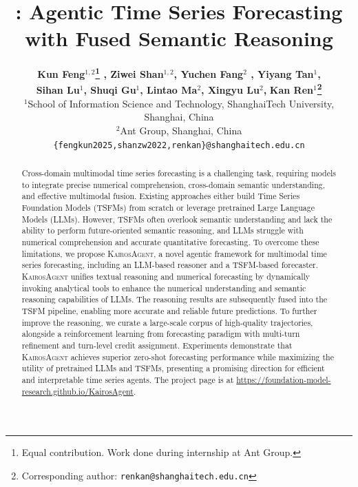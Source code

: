 \documentclass[11pt]{article}
\title{\method: Agentic Time Series Forecasting with Fused Semantic Reasoning}
\author{
\textbf{Kun Feng$^{1, 2}$\thanks{
Equal contribution.
Work done during internship at Ant Group.
} ,
Ziwei Shan$^{1, 2}$\footnotemark[1] ,
Yuchen Fang$^{2}$ ,
Yiyang Tan$^{1}$,}
\\
\textbf{Sihan Lu$^{1}$, Shuqi Gu$^{1}$, Lintao Ma$^{2}$, Xingyu Lu$^{2}$,}
\textbf{Kan Ren$^{1}$\thanks{Corresponding author: \texttt{renkan@shanghaitech.edu.cn}}} \\
$^{1}$School of Information Science and Technology, ShanghaiTech University, Shanghai, China \\
$^{2}$Ant Group, Shanghai, China \\
\texttt{\{fengkun2025,shanzw2022,renkan\}@shanghaitech.edu.cn}
}
\newcommand{\method}{\textsc{KairosAgent}\xspace}
\begin{document}
\maketitle
\begin{abstract}
Cross-domain multimodal time series forecasting is a challenging task, requiring models to integrate precise numerical comprehension, cross-domain semantic understanding, and effective multimodal fusion.
Existing approaches either build Time Series Foundation Models (TSFMs) from scratch or leverage pretrained Large Language Models (LLMs).
However, TSFMs often overlook semantic understanding and lack the ability to perform future-oriented semantic reasoning, and LLMs struggle with numerical comprehension and accurate quantitative forecasting.
To overcome these limitations, we propose \method, a novel agentic framework for multimodal time series forecasting, including an LLM-based reasoner and a TSFM-based forecaster.
\method unifies textual reasoning and numerical forecasting by dynamically invoking analytical tools to enhance the numerical understanding and semantic reasoning capabilities of LLMs.
The reasoning results are subsequently fused into the TSFM pipeline, enabling more accurate and reliable future predictions.
To further improve the reasoning, we curate a large-scale corpus of high-quality trajectories, alongside a reinforcement learning from forecasting paradigm with multi-turn refinement and turn-level credit assignment.
Experiments demonstrate that \method achieves superior zero-shot forecasting performance while maximizing the utility of pretrained LLMs and TSFMs, presenting a promising direction for efficient and interpretable time series agents.
The project page is at \url{https://foundation-model-research.github.io/KairosAgent}.
\end{abstract}
\end{document}
